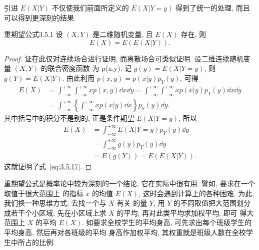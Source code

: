 	引进 $E(X|Y)$ 不仅使我们前面所定义的 $E(X|Y=y)$ 得到了统一的处理, 而且可以得到更深刻的结果.
	\begin{theorem}{重期望公式}{3.5.1}
		设 $(X,Y)$ 是二维随机变量, 且 $E(X)$ 存在, 则
		\begin{equation}
			E(X)=E(E(X|Y)).\label{eq:3.5.17}
		\end{equation}
	\end{theorem}
	\begin{proof}
		证在此仅对连续场合进行证明, 而离散场合可类似证明. 设二维连续随机变量 $(X,Y)$ 的联合密度函数
		为 p(x,y). 记 $g(y)=E(X|Y=y)$, 则 $g(Y)=E(X|Y)$. 由此利用 $p(x,y)=p(x|y)p_Y(y)$, 可得
		\begin{align*}
		 E(X) &=\int_{-\infty}^{+\infty} \int_{-\infty}^{+\infty} x p(x, y) \dd x \dd y=
		 \int_{-\infty}^{+\infty} \int_{-\infty}^{+\infty} x p(x | y) p_{Y}(y) \dd x \dd y \\
		 &=\int_{-\infty}^{+\infty}\left\{\int_{-\infty}^{+\infty} x p(x | y) \dd x \right\}
		  p_{Y}(y) \dd y.
		\end{align*}
		其中括号中的积分不是别的, 正是条件期望 $E(X|Y=y)$, 所以
		\begin{align*}
		E(X) &=\int_{-\infty}^{+\infty} E(X | Y=y) p_{Y}(y) \dd y \\
		&=\int_{-\infty}^{+\infty} g(y) p_{Y}(y) \dd y \\
		&=E(g(Y))=E(E(X|Y)).
		\end{align*}
		这就证明了式~\eqref{eq:3.5.17}.
	\end{proof}
	重期望公式是概率论中较为深刻的一个结论, 它在实际中很有用. 譬如, 要求在一个取值于很大范围上
	的指标 $x$ 的均值 $E(X)$, 这时会遇到计算上的各种困难. 为此, 我们换一种思维方式, 去找一个与 $X$ 有关
	的量 $Y$, 用 $Y$ 的不同取值把大范围划分成若干个小区域, 先在小区域上求 $X$ 的平均, 再对此类平均求加权平均, 即可
	得大范围上 $X$ 的平均 $E(X)$. 如要求全校学生的平均身高, 可先求出每个班级学生的平均身高, 然后再对各班级的平均
	身高作加权平均, 其权重就是班级人数在全校学生中所占的比例.

